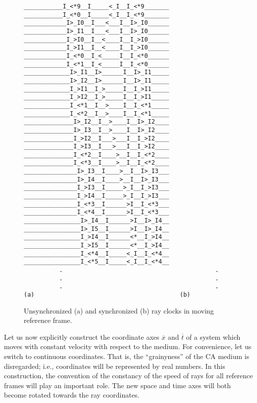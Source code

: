 \documentclass[pra,amsfonts, twocolumn]{revtex4}
\begin{document}
\begin{figure}[t]
{\begin{verbatim}
___________I_<*9__I_____<_I__I_<*9_______   ___________I_<*0__I_____<_I__I_<*9_______
____________I>_I0__I___<___I__I>_I0______   ____________I>_I1__I___<___I__I>_I0______
____________I_>I0__I__<____I__I_>I0______   ____________I_>I1__I__<____I__I_>I0______
____________I_<*0__I_<_____I__I_<*0______   ____________I_<*1__I_<_____I__I_<*0______
_____________I>_I1__I>______I__I>_I1_____   _____________I>_I2__I>______I__I>_I1_____
_____________I_>I1__I_>_____I__I_>I1_____   _____________I_>I2__I_>_____I__I_>I1_____
_____________I_<*1__I__>____I__I_<*1_____   _____________I_<*2__I__>____I__I_<*1_____
______________I>_I2__I__>____I__I>_I2____   ______________I>_I3__I__>____I__I>_I2____
______________I_>I2__I___>___I__I_>I2____   ______________I_>I3__I___>___I__I_>I2____
______________I_<*2__I____>__I__I_<*2____   ______________I_<*3__I____>__I__I_<*2____
_______________I>_I3__I____>__I__I>_I3___   _______________I>_I4__I____>__I__I>_I3___
_______________I_>I3__I_____>_I__I_>I3___   _______________I_>I4__I_____>_I__I_>I3___
_______________I_<*3__I______>I__I_<*3___   _______________I_<*4__I______>I__I_<*3___
________________I>_I4__I______>I__I>_I4__   ________________I>_I5__I______>I__I>_I4__
________________I_>I4__I______<*__I_>I4__   ________________I_>I5__I______<*__I_>I4__
________________I_<*4__I_____<_I__I_<*4__   ________________I_<*5__I_____<_I__I_<*4__
          .                                           .
          .                                           .
          .                                           .
(a)                                         (b)
 \end{verbatim}  }
\caption{Unsynchronized (a) and synchronized (b) ray clocks in moving
reference frame. \label{f:3}}
\end{figure}


Let us now explicitly construct the coordinate axes ${\overline x}$ and
${\overline t}$ of a system which moves with constant velocity with
respect to the medium.
For convenience, let us switch to continuous coordinates. That is, the
``grainyness'' of the CA medium
is disregarded; i.e., coordinates will be represented by real numbers.
In this construction, the convention of the constancy
of the speed
of rays for all reference frames will play an important role. The new
space
and time axes will both become rotated towards the ray coordinates.
\end{document}
